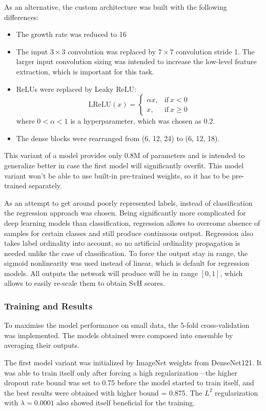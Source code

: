 \documentclass[thesis=B,english]{FITthesis}[2019/12/23]
\begin{document}
As an alternative, the custom architecture was built with the following differences:
\begin{itemize}
	\item The growth rate was reduced to 16
	\item The input $3 \times 3$ convolution was replaced by $7 \times 7$ convolution stride 1. The larger input convolution sizing was intended to increase the low-level feature extraction, which is important for this task.
	\item ReLUs were replaced by Leaky ReLU:
	\[
	\text{LReLU}(x) = 
	\begin{cases}
	\alpha x, & \text{if}\ x<0 \\
	x, & \text{if}\ x \geq 0
	\end{cases}
	\]
	where $0 < \alpha < 1$ is a hyperparameter, which was chosen as 0.2.
	\item The dense blocks were rearranged from (6, 12, 24) to (6, 12, 18).
\end{itemize}
This variant of a model provides only 0.8M of parameters and is intended to generalize better in case the first model will significantly overfit. This model variant won't be able to use built-in pre-trained weights, so it has to be pre-trained separately.

As an attempt to get around poorly represented labels, instead of classification the regression approach was chosen. Being significantly more complicated for deep learning models than classification, regression allows to overcome absence of samples for certain classes and still produce continuous output. Regression also takes label ordinality into account, so no artificial ordinality propagation is needed unlike the case of classification. To force the output stay in range, the sigmoid nonlinearity was used instead of linear, which is default for regression models. All outputs the network will produce will be in range $[0, 1]$, which allows to easily re-scale them to obtain SvH scores.

\subsubsection{Training and Results}

To maximise the model performance on small data, the 5-fold cross-validation was implemented. The models obtained were composed into ensemble by averaging their outputs.

The first model variant was initialized by ImageNet weights from DenseNet121. It was able to train itself only after forcing a high regularization---the higher dropout rate bound was set to 0.75 before the model started to train itself, and the best results were obtained with higher bound = 0.875. The $L^2$ regularization with $\lambda = 0.0001$ also showed itself beneficial for the training.
\end{document}
